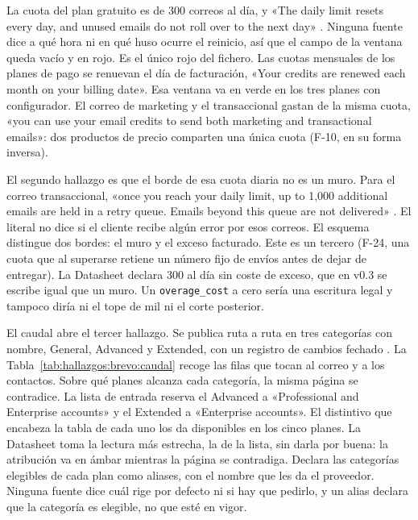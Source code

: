 La cuota del plan gratuito es de 300 correos al día, y «The daily limit
resets every day, and unused emails do not roll over to the next day»
\citep{brevohelpfree}. Ninguna fuente dice a qué hora ni en qué huso ocurre
el reinicio, así que el campo de la ventana queda vacío y en rojo. Es el
único rojo del fichero. Las cuotas mensuales de los planes de pago se
renuevan el día de facturación, «Your credits are renewed each month on
your billing date». Esa ventana va en verde en los tres planes con
configurador. El correo de marketing y el transaccional gastan de la misma
cuota, «you can use your email credits to send both marketing and
transactional emails»: dos productos de precio comparten una única cuota (F-10, en su forma inversa).

El segundo hallazgo es que el borde de esa cuota diaria no es un muro.
Para el correo transaccional, «once you reach your daily limit, up to
1,000 additional emails are held in a retry queue. Emails beyond this
queue are not delivered» \citep{brevohelpfree}. El literal no dice si el
cliente recibe algún error por esos correos. El esquema distingue dos
bordes: el muro y el exceso facturado. Este es un tercero (F-24, una cuota
que al superarse retiene un número fijo de envíos antes de dejar de
entregar). La Datasheet declara 300 al día sin coste de exceso, que en
v0.3 se escribe igual que un muro. Un \texttt{overage\_cost} a cero sería
una escritura legal y tampoco diría ni el tope de mil ni el corte
posterior.

El caudal abre el tercer hallazgo. Se publica ruta a ruta en tres categorías con nombre, General, Advanced y Extended, con un registro de cambios
fechado \citep{brevodocs}. La Tabla~\ref{tab:hallazgos:brevo:caudal}
recoge las filas que tocan al correo y a los contactos. Sobre qué planes
alcanza cada categoría, la misma página se contradice. La lista de entrada
reserva el Advanced a «Professional and Enterprise accounts» y el Extended
a «Enterprise accounts». El distintivo que encabeza la tabla de cada uno
los da disponibles en los cinco planes. La Datasheet toma la lectura más
estrecha, la de la lista, sin darla por buena: la atribución va en ámbar
mientras la página se contradiga. Declara las categorías elegibles de cada plan
como aliases, con el nombre que les da el proveedor. Ninguna
fuente dice cuál rige por
defecto ni si hay que pedirlo, y un alias declara que la categoría es elegible,
no que esté en vigor.

